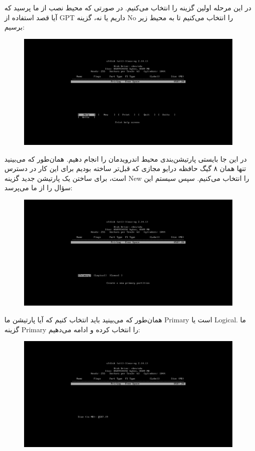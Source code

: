 \documentclass{article}
\begin{document}
در این مرحله اولین گزینه را انتخاب می‌کنیم. در صورتی که محیط نصب از ما پرسید که آیا قصد استفاده از GPT داریم یا نه، گزینه No را انتخاب می‌کنیم تا به محیط زیر برسیم:

\begin{figure}[ht]
	\centering	
	\includegraphics[width = 1\textwidth]{images/install3.png}
\end{figure}

در این جا بایستی پارتیشن‌بندی محیط اندرویدمان را انجام دهیم. همان‌طور که می‌بینید تنها همان ۸ گیگ حافظه درایو مجازی که قبل‌تر ساخته بودیم برای این کار در دسترس است، برای ساختن یک پارتیشن جدید گزینه New را انتخاب می‌کنیم. سپس سیستم این سؤال را از ما می‌پرسد:

\begin{figure}[ht]
	\centering	
	\includegraphics[width = 1\textwidth]{images/install4.png}
\end{figure}

همان‌طور که می‌بینید باید انتخاب کنیم که آیا پارتیشن ما Primary است یا Logical. ما گزینه Primary را انتخاب کرده و ادامه می‌دهیم:

\newpage

\begin{figure}[ht]
	\centering	
	\includegraphics[width = 1\textwidth]{images/install5.png}
\end{figure}
\end{document}
